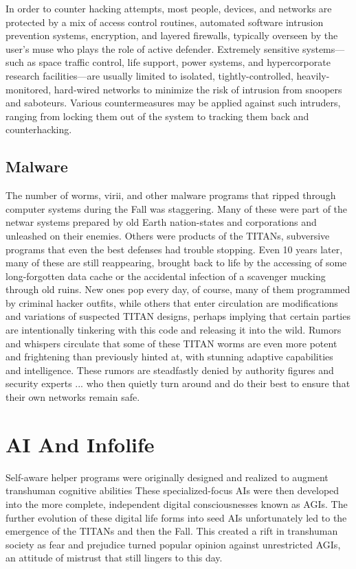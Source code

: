 In order to counter hacking attempts, most people, 
devices, and networks are protected by a mix of 
access control routines, automated software intrusion
prevention systems, encryption, and layered
firewalls, typically overseen by the user's muse who 
plays the role of active defender. Extremely sensitive 
systems—such as space traffic control, life support, 
power systems, and hypercorporate research facilities—are
usually limited to isolated, tightly-controlled,
heavily-monitored, hard-wired networks to minimize 
the risk of intrusion from snoopers and saboteurs. 
Various countermeasures may be applied against 
such intruders, ranging from locking them out of the 
system to tracking them back and counterhacking.

\subsection{Malware}

The number of worms, virii, and other malware programs
that ripped through computer systems during
the Fall was staggering. Many of these were part of 
the netwar systems prepared by old Earth nation-states 
and corporations and unleashed on their enemies. 
Others were products of the TITANs, subversive programs
that even the best defenses had trouble stopping.
Even 10 years later, many of these are still reappearing, 
brought back to life by the accessing of some long-forgotten
data cache or the accidental infection of a
scavenger mucking through old ruins. New ones pop 
every day, of course, many of them programmed by 
criminal hacker outfits, while others that enter circulation
are modifications and variations of suspected
TITAN designs, perhaps implying that certain parties 
are intentionally tinkering with this code and releasing 
it into the wild. Rumors and whispers circulate that 
some of these TITAN worms are even more potent and 
frightening than previously hinted at, with stunning 
adaptive capabilities and intelligence. These rumors 
are steadfastly denied by authority figures and security 
experts ... who then quietly turn around and do their 
best to ensure that their own networks remain safe.

\section{AI And Infolife}

Self-aware helper programs were originally designed 
and realized to augment transhuman cognitive abilities
These specialized-focus AIs were then developed
into the more complete, independent digital consciousnesses
known as AGIs. The further evolution of these
digital life forms into seed AIs unfortunately led to the 
emergence of the TITANs and then the Fall. This created
a rift in transhuman society as fear and prejudice
turned popular opinion against unrestricted AGIs, an 
attitude of mistrust that still lingers to this day.

